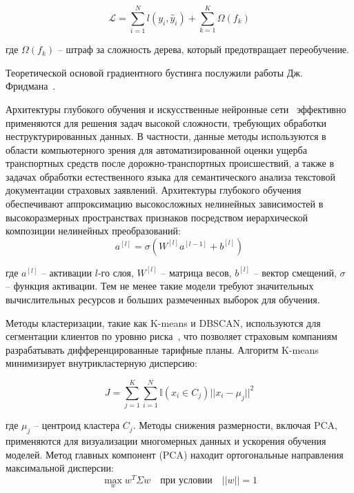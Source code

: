 \begin{equation*}
\mathcal{L} = \sum_{i=1}^{N} l(y_i, \hat{y}_i) + \sum_{k=1}^{K} \Omega(f_k)
\end{equation*}

где $\Omega(f_k)$ – штраф за сложность дерева, который предотвращает переобучение.

Теоретической основой градиентного бустинга послужили работы Дж. Фридмана~\cite{friedman2001greedy}.

Архитектуры глубокого обучения и искусственные нейронные сети~\cite{kruglov2001neural} эффективно применяются для решения задач высокой сложности, требующих обработки неструктурированных данных. В частности, данные методы используются в области компьютерного зрения для автоматизированной оценки ущерба транспортных средств после дорожно-транспортных происшествий, а также в задачах обработки естественного языка для семантического анализа текстовой документации страховых заявлений. Архитектуры глубокого обучения обеспечивают аппроксимацию высокосложных нелинейных зависимостей в высокоразмерных пространствах признаков посредством иерархической композиции нелинейных преобразований:
\begin{equation*}
a^{[l]} = \sigma(W^{[l]} a^{[l-1]} + b^{[l]})
\end{equation*}

где $a^{[l]}$ – активации $l$-го слоя, $W^{[l]}$ – матрица весов, $b^{[l]}$ – вектор смещений, $\sigma$ – функция активации. Тем не менее такие модели требуют значительных вычислительных ресурсов и больших размеченных выборок для обучения.

Методы кластеризации, такие как K-means и DBSCAN, используются для сегментации клиентов по уровню риска~\cite{russell2020aima}, что позволяет страховым компаниям разрабатывать дифференцированные тарифные планы. Алгоритм K-means минимизирует внутрикластерную дисперсию:

\begin{equation*}
J = \sum_{j=1}^{K} \sum_{i=1}^{N} \mathbb{I}(x_i \in C_j) ||x_i - \mu_j||^2
\end{equation*}

где $\mu_j$ – центроид кластера $C_j$. Методы снижения размерности, включая PCA, применяются для визуализации многомерных данных и ускорения обучения моделей. Метод главных компонент (PCA) находит ортогональные направления максимальной дисперсии:
\begin{equation*}
\max_{w} w^T \Sigma w \quad \text{при условии} \quad ||w|| = 1
\end{equation*}

